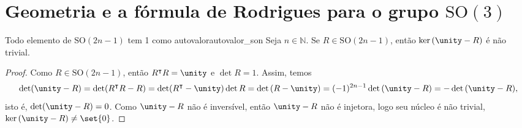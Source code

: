 \section[Geometria e a fórmula de Rodrigues para o grupo SO(3)]{Geometria e a fórmula de Rodrigues para o grupo \(\mathrm{SO}(3)\)}
\begin{lemma}{Todo elemento de \(\mathrm{SO}(2n-1)\) tem 1 como autovalor}{autovalor_son}
    Seja \(n \in \mathbb{N}\). Se \(R \in \mathrm{SO}(2n - 1)\), então \(\ker{(\unity - R)}\) é não trivial.
\end{lemma}
\begin{proof}
    Como \(R \in \mathrm{SO}(2n - 1)\), então \(R^\intercal R = \unity\) e \(\det{R} = 1\). Assim, temos
    \begin{equation*}
        \det(\unity - R) = \det(R^\intercal R - R) = \det(R^\intercal -\unity)\det{R} = \det{(R-\unity)} = (-1)^{2n - 1}\det{(\unity - R)} = -\det{(\unity - R)},
    \end{equation*}
    isto é, \(\det(\unity - R) = 0\). Como \(\unity - R\) não é inversível, então \(\unity - R\) não é injetora, logo seu núcleo é não trivial, \(\ker{(\unity - R)} \neq \set{0}\).
\end{proof}

